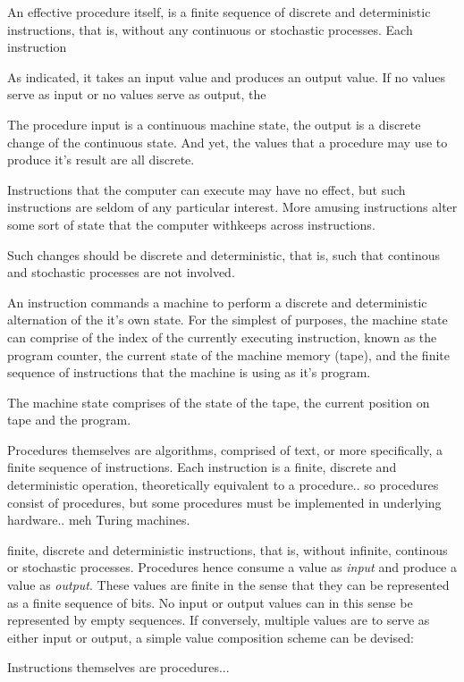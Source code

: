 An effective procedure itself, is a finite sequence of discrete and
deterministic instructions, that is, without any continuous or stochastic
processes. Each instruction 

As indicated, it takes an input value and produces an output
value. If no values serve as input or no values serve as output, the

The procedure input is a continuous machine state, the output is a discrete
change of the continuous state. And yet, the values that a procedure may use to
produce it's result are all discrete.

Instructions that the computer can execute may have no effect, but such
instructions are seldom of any particular interest. More amusing instructions
alter some sort of state that the computer withkeeps across instructions.

Such changes should be discrete and deterministic, that is, such that continous
and stochastic processes are not involved.

An instruction
commands a machine to perform a discrete and deterministic alternation of the
it's own state. For the simplest of purposes, the machine state can comprise of
the index of the currently executing instruction, known as the program counter,
the current state of the machine memory (tape), and the finite sequence of
instructions that the machine is using as it's program.

The machine state comprises of the state of the tape, the current position on
tape and the program.

Procedures themselves are algorithms, comprised of text, or more specifically,
a finite sequence of instructions. Each instruction is a finite, discrete and
deterministic operation, theoretically equivalent to a procedure.. so
procedures consist of procedures, but some procedures must be implemented in
underlying hardware.. meh Turing machines.

finite, discrete and deterministic instructions, that is,
without infinite, continous or stochastic processes. Procedures hence consume a
value as \emph{input} and produce a value as \emph{output}. These values are
finite in the sense that they can be represented as a finite sequence of bits.
No input or output values can in this sense be represented by empty sequences.
If conversely, multiple values are to serve as either input or output, a simple
value composition scheme can be devised:

Instructions themselves are procedures...

